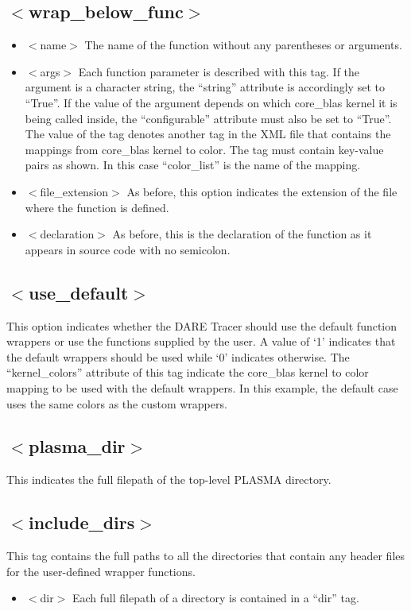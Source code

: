 \documentclass{article}
\begin{document}
\subsection{$<$wrap\_below\_func$>$}
\begin{itemize}
\item $<$name$>$ The name of the function without any parentheses or arguments.
\item $<$args$>$ Each function parameter is described with this tag. If the argument is a character string, the ``string'' attribute is accordingly set to ``True''. If the value of the argument depends on which core\_blas kernel it is being called inside, the ``configurable'' attribute must also be set to ``True''. The value of the tag denotes another tag in the XML file that contains the mappings from core\_blas kernel to color. The tag must contain key-value pairs as shown. In this case ``color\_list'' is the name of the mapping.
\item $<$file\_extension$>$ As before, this option indicates the extension of the file where the function is defined.
\item $<$declaration$>$ As before, this is the declaration of the function as it appears in source code with no semicolon.
\end{itemize}
\subsection{$<$use\_default$>$} This option indicates whether the DARE Tracer should use the default function wrappers or use the functions supplied by the user. A value of `1' indicates that the default wrappers should be used while `0' indicates otherwise. The ``kernel\_colors'' attribute of this tag indicate the core\_blas kernel to color mapping to be used with the default wrappers. In this example, the default case uses the same colors as the custom wrappers.
\subsection{$<$plasma\_dir$>$} This indicates the full filepath of the top-level PLASMA directory.

\subsection{$<$include\_dirs$>$} This tag contains the full paths to all the directories that contain any header files for the user-defined wrapper functions.
\begin{itemize}
\item $<$dir$>$ Each full filepath of a directory is contained in a ``dir'' tag.
\end{itemize}
\end{document}

